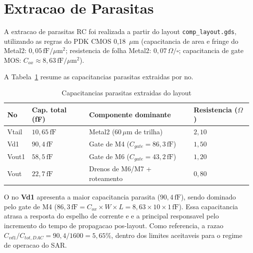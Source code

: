\documentclass[12pt, a4paper]{article}
\begin{document}
\section{Extracao de Parasitas}

A extracao de parasitas RC foi realizada a partir do layout \texttt{comp\_layout.gds},
utilizando as regras do PDK CMOS 0{,}18~$\mu$m (capacitancia de area e fringe do Metal2:
$0{,}05\,\text{fF}/\mu\text{m}^2$; resistencia de folha Metal2: $0{,}07\,\Omega/\square$;
capacitancia de gate MOS: $C_{ox} \approx 8{,}63\,\text{fF}/\mu\text{m}^2$).

A Tabela~\ref{tab:parasitas} resume as capacitancias parasitas extraidas por no.

\begin{table}[H]
\centering
\caption{Capacitancias parasitas extraidas do layout}
\label{tab:parasitas}
\begin{tabular}{llll}
\toprule
\textbf{No} & \textbf{Cap. total (fF)} & \textbf{Componente dominante} & \textbf{Resistencia ($\Omega$)} \\
\midrule
Vtail  & $10{,}65\,\text{fF}$ & Metal2 ($60\,\mu\text{m}$ de trilha) & $2{,}10$ \\
Vd1    & $90{,}4\,\text{fF}$  & Gate de M4 ($C_{gate}=86{,}3\,\text{fF}$) & $1{,}50$ \\
Vout1  & $58{,}5\,\text{fF}$  & Gate de M6 ($C_{gate}=43{,}2\,\text{fF}$) & $1{,}20$ \\
Vout   & $22{,}7\,\text{fF}$  & Drenos de M6/M7 + roteamento & $0{,}80$ \\
\bottomrule
\end{tabular}
\end{table}

O no \textbf{Vd1} apresenta a maior capacitancia parasita ($90{,}4\,\text{fF}$), sendo
dominado pelo gate de M4 ($86{,}3\,\text{fF} = C_{ox} \times W \times L =
8{,}63 \times 10 \times 1\,\text{fF}$). Essa capacitancia atrasa a resposta do espelho
de corrente e e a principal responsavel pelo incremento do tempo de propagacao pos-layout.
Como referencia, a razao $C_{vd1}/C_{tot,DAC} = 90{,}4/1600 = 5{,}65\%$, dentro dos
limites aceitaveis para o regime de operacao do SAR.

\end{document}
